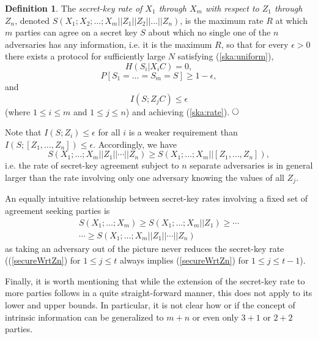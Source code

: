\documentclass[a4paper, twoside, openany]{report}
\newcommand{\eps}{\epsilon}
\theoremstyle{plain}
\theoremstyle{definition}
\newtheorem{definition}[theorem]{Definition}
\newcommand{\textcirc}{%
  \setlength{\unitlength}{1.5ex}%
  \begin{picture}(1.1,1)(-.55,-.55)%
    \put(0,0){\circle{1.1}}%
  \end{picture}}
\newcommand{\definitionend}{\hspace*{\fill} $\textcirc$}
\begin{document}
\begin{definition}
{\rm
The {\it secret-key rate of $X_1$ through $X_m$ with respect to $Z_1$ through $Z_n$}, denoted $S(X_1;X_2;\ldots;X_m||Z_1||Z_2|| \ldots ||Z_n)$, is the maximum rate $R$ at which $m$ parties can agree on a secret key $S$ about which no single one of the $n$ adversaries has any information, i.e. it is the maximum $R$, so that for every $\eps > 0$ there exists a protocol for sufficiently large $N$ satisfying (\ref{ska:uniform}),
\[H(S_i|X_iC) = 0,\]
\[P[S_1 = \ldots = S_m = S] \geq 1-\eps,\]
and
\begin{equation} \label{secureWrtZn}
I(S;Z_jC) \leq \eps
\end{equation}
(where $1\leq i\leq m$ and $1\leq j\leq n$) and achieving (\ref{ska:rate}).
}
\definitionend
\end{definition}

Note that $I(S;Z_i) \leq \eps$ for all $i$ is a weaker requirement than $I(S;[Z_1,\ldots,Z_n]) \leq \eps$. Accordingly, we have 
\begin{equation} \label{combineAdv}
S(X_1;\ldots;X_m||Z_1||\cdots||Z_n) \geq S(X_1;\ldots;X_m||[Z_1,\ldots,Z_n]),
\end{equation}
i.e. the rate of secret-key agreement subject to $n$ separate adversaries is in general larger than the rate involving only one adversary knowing the values of all $Z_j$.

An equally intuitive relationship between secret-key rates involving a fixed set of agreement seeking parties is
\begin{eqnarray} 
S(X_1;\ldots;X_m) \geq S(X_1;\ldots;X_m||Z_1) \geq \cdots \label{addAdv} \\ 
\cdots \geq S(X_1;\ldots;X_m||Z_1||\cdots||Z_n) \nonumber
\end{eqnarray}
as taking an adversary out of the picture never reduces the secret-key rate ((\ref{secureWrtZn}) for $1\leq j\leq t$ always implies (\ref{secureWrtZn}) for $1\leq j\leq t-1$).

Finally, it is worth mentioning that while the extension of the secret-key rate to more parties follows in a quite straight-forward manner, this does not apply to its lower and upper bounds. In particular, it is not clear how or if the concept of intrinsic information can be generalized to $m + n$ or even only $3 + 1$ or $2 + 2$ parties.


\end{document}
